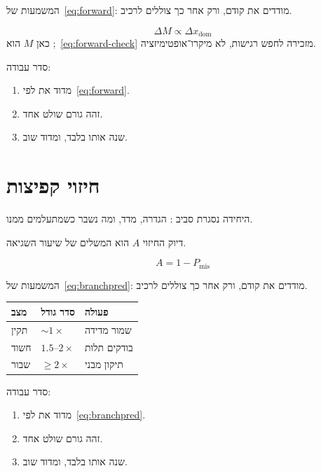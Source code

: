 המשמעות של~\eqref{eq:forward}: מודדים את  קודם, ורק אחר כך צוללים לרכיב.

\begin{equation}
\label{eq:forward-check}
\Delta M \propto \Delta x_{\mathrm{dom}}
\end{equation}
כאן $M$ הוא ;~\eqref{eq:forward-check} מזכירה לחפש רגישות, לא מיקרו־אופטימיזציה.

סדר עבודה:
\begin{enumerate}
\item[(\textbf{א})] מדוד את  לפי~\eqref{eq:forward}.
\item[(\textbf{ב})] זהה גורם שולט אחד.
\item[(\textbf{ג})] שנה אותו בלבד, ומדוד שוב.
\end{enumerate}

\chapter{חיזוי קפיצות}
\label{ch:branchpred}

היחידה נסגרת סביב : הגדרה, מדד, ומה נשבר כשמתעלמים ממנו.

\begin{notebox}[frametitle={הערה — חיזוי קפיצות}]
דיוק החיזוי $A$ הוא המשלים של שיעור השגיאה.
\end{notebox}

\begin{equation}
\label{eq:branchpred}
A = 1 - P_{\mathrm{mis}}
\end{equation}

המשמעות של~\eqref{eq:branchpred}: מודדים את  קודם, ורק אחר כך צוללים לרכיב.

\begin{tablebox}\centering\small
\begin{tabular}{@{}lll@{}}
\toprule
\textbf{מצב} & \textbf{סדר גודל} & \textbf{פעולה}\\
\midrule
תקין & $\sim 1\times$ & שמור מדידה\\
חשוד & $1.5$–$2\times$ & בודקים תלות\\
שבור & $\ge 2\times$ & תיקון מבני\\
\bottomrule
\end{tabular}
\end{tablebox}

סדר עבודה:
\begin{enumerate}
\item[(\textbf{א})] מדוד את  לפי~\eqref{eq:branchpred}.
\item[(\textbf{ב})] זהה גורם שולט אחד.
\item[(\textbf{ג})] שנה אותו בלבד, ומדוד שוב.
\end{enumerate}

